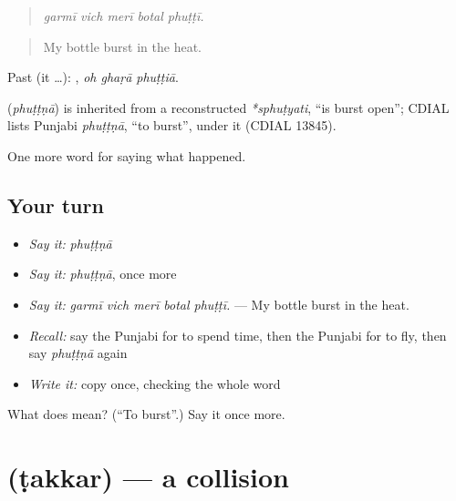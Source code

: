 \begin{quote}
    
\end{quote}

\begin{quote}
\emph{garmī vich merī botal phuṭṭī.}
\end{quote}

\begin{quote}
My bottle burst in the heat.
\end{quote}

Past (it …):   , \emph{oh ghaṛā phuṭṭiā}.

\begin{cousinweb}
\textbf{} (\emph{phuṭṭṇā}) is inherited from a reconstructed \emph{*sphuṭyati}, \textquotedblleft{}is burst open\textquotedblright{}; CDIAL lists Punjabi \emph{phuṭṭṇā}, \textquotedblleft{}to burst\textquotedblright{}, under it (CDIAL 13845).
\end{cousinweb}

\begin{grammarlens}[title={What you've built}]
One more word for saying what happened.
\end{grammarlens}

\subsection*{Your turn}
\begin{itemize}
\raggedright
  \item \emph{Say it:} \emph{phuṭṭṇā}
  \item \emph{Say it:} \emph{phuṭṭṇā}, once more
  \item \emph{Say it:} \emph{garmī vich merī botal phuṭṭī.} — My bottle burst in the heat.
  \item \emph{Recall:} say the Punjabi for to spend time, then the Punjabi for to fly, then say \emph{phuṭṭṇā} again
  \item \emph{Write it:} copy \textbf{} once, checking the whole word
\end{itemize}

\begin{tcolorbox}[breakable,colback=teal!4,colframe=teal!35!black,title={Before you move on}]
What does  mean? (\textquotedblleft{}To burst\textquotedblright{}.) Say it once more.
\end{tcolorbox}
\section[\texorpdfstring{\pa{ਟੱਕਰ} (ṭakkar)}{ਟੱਕਰ (ṭakkar)}]{ (ṭakkar) — a collision}

